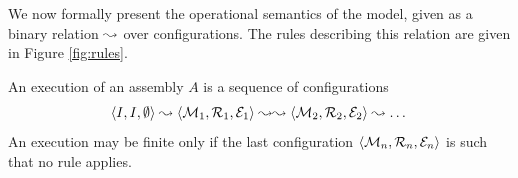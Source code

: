 


We now formally present the operational semantics of the \mad model,
given as a binary relation $\leadsto$ over configurations. The rules
describing this relation are given in Figure \ref{fig:rules}.

An execution of an assembly $A$ is a sequence of configurations
\[
\langle I, I, \emptyset \rangle \leadsto \langle \mathcal{M}_1, \mathcal{R}_1, \mathcal{E}_1 \rangle \leadsto \leadsto \langle \mathcal{M}_2, \mathcal{R}_2, \mathcal{E}_2 \rangle \leadsto \dots
\]
An execution may be finite only if the last configuration $\langle
\mathcal{M}_n, \mathcal{R}_n, \mathcal{E}_n \rangle$ is such that no rule applies.

